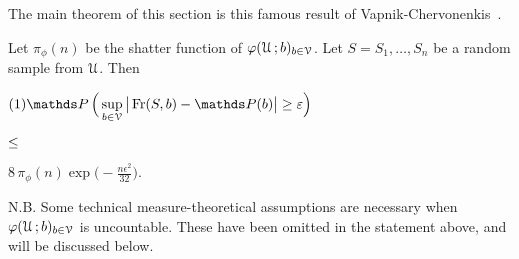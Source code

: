\documentclass[scombinatorics.tex]{subfiles}
\begin{document}
The main theorem of this section is this famous result of Vapnik-Chervonenkis~\cite{VC}.


\def\medrel#1{\parbox[t]{5ex}{$\displaystyle\hfil #1$}}
\def\ceq#1#2#3{\parbox[t]{35ex}{$\displaystyle #1$}\medrel{#2}{$\displaystyle #3$}}

\begin{void_thm}\label{VC_inequality}
  Let $\pi_\phi(n)$ be the shatter function of $\varphi(\EuScript U\,;b)_{b\in\EuScript V}$.
  Let $S=S_1,\dots,S_n$ be a random sample from $\EuScript U$.
  Then

  \ceq{(1)\hfill\Pr\,\Big(\sup_{b\in\V}\big|\Fr(S,b) - \Pr(b)\big|\ge\epsilon\Big)}
  {\le}
  {8\,\pi_\phi(n)\exp\bigg(-\frac{n\epsilon^2}{32}\bigg).}
\end{void_thm}

N.B. Some technical measure-theoretical assumptions are necessary when $\varphi(\EuScript U\,;b)_{b\in\EuScript V}$ is uncountable.
These have been omitted in the statement above, and will be discussed below.
\end{document}
